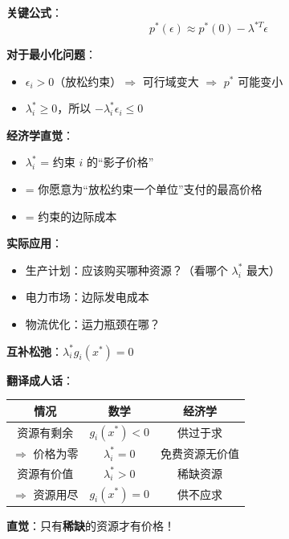 \documentclass[12pt, a4paper]{ctexart}
\begin{document}
\begin{blackboard}[影子价格的正确理解]

\textbf{关键公式}：
\[
p^*(\epsilon) \approx p^*(0) - \lambda^{*T} \epsilon
\]

\textbf{对于最小化问题}：
\begin{itemize}
    \item $\epsilon_i > 0$（放松约束）$\Rightarrow$ 可行域变大 $\Rightarrow$ $p^*$ 可能变小
    \item $\lambda_i^* \geq 0$，所以 $-\lambda_i^* \epsilon_i \leq 0$
\end{itemize}

\textbf{经济学直觉}：
\begin{itemize}
    \item $\lambda_i^*$ = 约束 $i$ 的``影子价格''
    \item = 你愿意为``放松约束一个单位''支付的最高价格
    \item = 约束的边际成本
\end{itemize}

\textbf{实际应用}：
\begin{itemize}
    \item 生产计划：应该购买哪种资源？（看哪个 $\lambda_i^*$ 最大）
    \item 电力市场：边际发电成本
    \item 物流优化：运力瓶颈在哪？
\end{itemize}

\end{blackboard}

\begin{blackboard}[互补松弛的经济学意义]

\textbf{互补松弛}：$\lambda_i^* g_i(x^*) = 0$

\textbf{翻译成人话}：

\begin{center}
\begin{tabular}{c|c|c}
情况 & 数学 & 经济学 \\
\hline
资源有剩余 & $g_i(x^*) < 0$ & 供过于求 \\
$\Rightarrow$ 价格为零 & $\lambda_i^* = 0$ & 免费资源无价值 \\
\hline
资源有价值 & $\lambda_i^* > 0$ & 稀缺资源 \\
$\Rightarrow$ 资源用尽 & $g_i(x^*) = 0$ & 供不应求
\end{tabular}
\end{center}

\textbf{直觉}：只有\textbf{稀缺}的资源才有价格！

\end{blackboard}
\end{document}
